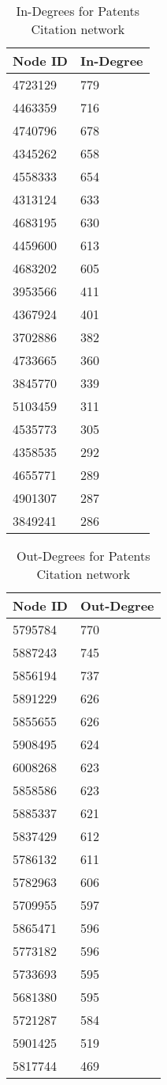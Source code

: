 \begin{table}[htbp]%
\centering
\begin{tabular}{|l|l|}
\hline
Node ID & In-Degree \\
\hline
4723129 & 779 \\
4463359 & 716 \\
4740796 & 678 \\
4345262 & 658 \\
4558333 & 654 \\
4313124 & 633 \\
4683195 & 630 \\
4459600 & 613 \\
4683202 & 605 \\
3953566 & 411 \\
4367924 & 401 \\
3702886 & 382 \\
4733665 & 360 \\
3845770 & 339 \\
5103459 & 311 \\
4535773 & 305 \\
4358535 & 292 \\
4655771 & 289 \\
4901307 & 287 \\
3849241 & 286 \\
\hline
\end{tabular}
\caption{In-Degrees for Patents Citation network}
\label{tab:patentsin}
\end{table}

\begin{table}[htbp]%
\centering
\begin{tabular}{|l|l|}
\hline
Node ID & Out-Degree \\
\hline
5795784 & 770 \\
5887243 & 745 \\
5856194 & 737 \\
5891229 & 626 \\
5855655 & 626 \\
5908495 & 624 \\
6008268 & 623 \\
5858586 & 623 \\
5885337 & 621 \\
5837429 & 612 \\
5786132 & 611 \\
5782963 & 606 \\
5709955 & 597 \\
5865471 & 596 \\
5773182 & 596 \\
5733693 & 595 \\
5681380 & 595 \\
5721287 & 584 \\
5901425 & 519 \\
5817744 & 469 \\
\hline
\end{tabular}
\caption{Out-Degrees for Patents Citation network}
\label{tab:patentsout}
\end{table}

